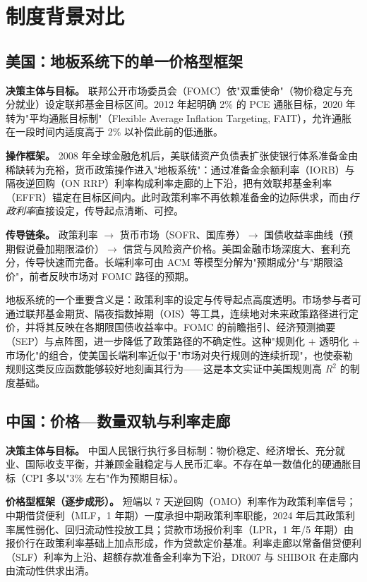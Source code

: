 \documentclass[12pt,a4paper]{ctexart}
\begin{document}
\section{制度背景对比}

\subsection{美国：地板系统下的单一价格型框架}
\textbf{决策主体与目标。} 联邦公开市场委员会（FOMC）依"双重使命"（物价稳定与充分就业）设定联邦基金目标区间。2012 年起明确 2\% 的 PCE 通胀目标，2020 年转为"平均通胀目标制"（Flexible Average Inflation Targeting, FAIT），允许通胀在一段时间内适度高于 2\% 以补偿此前的低通胀。

\textbf{操作框架。} 2008 年全球金融危机后，美联储资产负债表扩张使银行体系准备金由稀缺转为充裕，货币政策操作进入"地板系统"：通过准备金余额利率（IORB）与隔夜逆回购（ON RRP）利率构成利率走廊的上下沿，把有效联邦基金利率（EFFR）锚定在目标区间内。此时政策利率不再依赖准备金的边际供求，而由\emph{行政利率}直接设定，传导起点清晰、可控。

\textbf{传导链条。} 政策利率 $\to$ 货币市场（SOFR、国库券）$\to$ 国债收益率曲线（预期假说叠加期限溢价）$\to$ 信贷与风险资产价格。美国金融市场深度大、套利充分，传导快速而完备。长端利率可由 ACM 等模型分解为"预期成分"与"期限溢价"，前者反映市场对 FOMC 路径的预期。

地板系统的一个重要含义是：政策利率的设定与传导起点高度透明。市场参与者可通过联邦基金期货、隔夜指数掉期（OIS）等工具，连续地对未来政策路径进行定价，并将其反映在各期限国债收益率中。FOMC 的前瞻指引、经济预测摘要（SEP）与点阵图，进一步降低了政策路径的不确定性。这种"规则化 $+$ 透明化 $+$ 市场化"的组合，使美国长端利率近似于"市场对央行规则的连续折现"，也使泰勒规则这类反应函数能够较好地刻画其行为——这是本文实证中美国规则高 $R^2$ 的制度基础。

\subsection{中国：价格—数量双轨与利率走廊}
\textbf{决策主体与目标。} 中国人民银行执行多目标制：物价稳定、经济增长、充分就业、国际收支平衡，并兼顾金融稳定与人民币汇率。不存在单一数值化的硬通胀目标（CPI 多以"3\% 左右"作为预期目标）。

\textbf{价格型框架（逐步成形）。} 短端以 7 天逆回购（OMO）利率作为政策利率信号；中期借贷便利（MLF，1 年期）一度承担中期政策利率职能，2024 年后其政策利率属性弱化、回归流动性投放工具；贷款市场报价利率（LPR，1 年/5 年期）由报价行在政策利率基础上加点形成，作为贷款定价基准。利率走廊以常备借贷便利（SLF）利率为上沿、超额存款准备金利率为下沿，DR007 与 SHIBOR 在走廊内由流动性供求出清。
\end{document}
